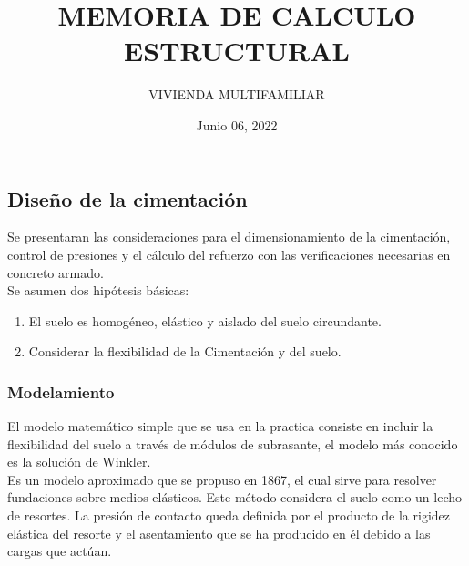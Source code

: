 \documentclass{article}%
\title{\textbf{MEMORIA DE CALCULO ESTRUCTURAL}}
\author{VIVIENDA MULTIFAMILIAR}
\date{Junio 06, 2022}
\renewcommand{\headrulewidth}{0.4pt}
\renewcommand{\footrulewidth}{0.4pt}
\begin{document}
%
\normalsize%

\normalsize%

\maketitle
\thispagestyle{empty}
\newpage

\clearpage                       %
{                                %
  \pagestyle{empty}              %
  {
    \fancyhf{}%
    \renewcommand{\headrulewidth}{0pt}%
    \renewcommand{\footrulewidth}{0pt}%
  }
    \begin{spacing}{1.35}
    \tableofcontents
  \end{spacing}
  \thispagestyle{empty}  
  \listoffigures
\newpage
\listoftables
  \thispagestyle{empty} 
}


\newpage


\subsection{Diseño de la cimentación}
Se presentaran las consideraciones para el dimensionamiento de la cimentación, control de presiones y el cálculo del refuerzo con las verificaciones necesarias en concreto armado.\\
Se asumen dos hipótesis básicas:
\begin{enumerate}
    \item El suelo es homogéneo, elástico y aislado del suelo circundante.
    \item Considerar la flexibilidad de la Cimentación y del suelo.
\end{enumerate}

\subsubsection{Modelamiento}
El modelo matemático simple que se usa en la practica consiste en incluir la flexibilidad del suelo a través de módulos de subrasante, el modelo más conocido es la solución de Winkler.\\
Es un modelo aproximado que se propuso en 1867, el cual sirve para resolver fundaciones sobre medios elásticos. Este método considera el suelo como un lecho de resortes. La presión de contacto queda definida por el producto de la rigidez elástica del resorte y el asentamiento que se ha producido en él debido a las cargas que actúan.\\
\end{document}
